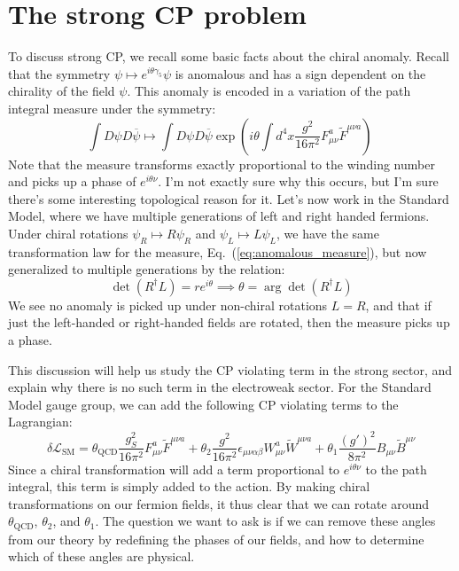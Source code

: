 \documentclass[11pt, oneside]{article}   	%
\theoremstyle{definition}
\begin{document}
\newpage
\section{The strong CP problem}


To discuss strong CP, we recall some basic facts about the chiral anomaly. Recall that the symmetry $\psi\mapsto e^{i\theta\gamma_5}\psi$ is anomalous 
and has a sign dependent on the chirality of the field $\psi$. This anomaly is encoded in a variation of the path integral measure under the symmetry:
\begin{equation}
	\int D\psi D\overline\psi \mapsto \int D\psi D\overline\psi \exp\left(i\theta\int d^4 x\frac{g^2}{16\pi^2} F_{\mu\nu}^a \tilde F^{\mu\nu a}\right)~
	\label{eq:anomalous_measure}
\end{equation}
Note that the measure transforms exactly proportional to the winding number and picks up a phase of $e^{i\theta\nu}$. I'm not exactly sure why this occurs, 
but I'm sure there's some interesting topological reason for it. Let's now work in the Standard Model, where we have multiple generations of left 
and right handed fermions. Under chiral rotations $\psi_R\mapsto R\psi_R$ and $\psi_L\mapsto L\psi_L$, we have the same transformation law 
for the measure, Eq.~(\ref{eq:anomalous_measure}), but now generalized to multiple generations by the relation:
\begin{equation}
	\det(R^\dagger L) = r e^{i\theta}\implies \theta = \arg\det(R^\dagger L)
\end{equation}
We see no anomaly is picked up under non-chiral rotations $L = R$, and that if just the left-handed or right-handed fields are rotated, then the 
measure picks up a phase. 

This discussion will help us study the CP violating term in the strong sector, and explain why there is no such term in the electroweak sector. 
For the Standard Model gauge group, we can add the following CP violating terms to the Lagrangian:
\begin{equation}
	\delta \mathcal L_\mathrm{SM} = \theta_\mathrm{QCD} \frac{g_S^2}{16 \pi^2} F_{\mu\nu}^a\tilde F^{\mu\nu a} 
		+ \theta_2 \frac{g^2}{16\pi^2} \epsilon_{\mu\nu\alpha\beta} W_{\mu\nu}^a \tilde W^{\mu\nu a} + \theta_1 \frac{(g')^2}{8\pi^2} B_{\mu\nu}\tilde B^{\mu\nu}
\end{equation}
Since a chiral transformation will add a term proportional to $e^{i\theta\nu}$ to the path integral, this term is simply added to the action. 
By making chiral transformations on our fermion fields, it thus clear that we can rotate around $\theta_\mathrm{QCD}$, $\theta_2$, and $\theta_1$. 
The question we want to ask is if we can remove these angles from our theory by redefining the phases of our fields, and how to determine which 
of these angles are physical.
\end{document}
